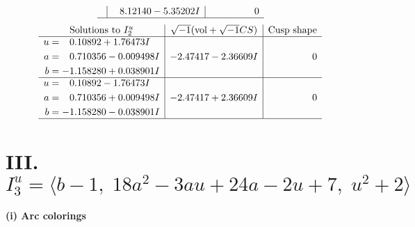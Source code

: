 \documentclass[1p]{elsarticle_modified}
\theoremstyle{definition}
\newcommand{\I}{\sqrt{-1}}
\begin{document}
$$\begin{array}{c|c|c}
 & \phantom{-}8.12140 - 5.35202 I & \phantom{-0.000000 } 0\\
 \hline 
 \end{array}$$\newpage$$\begin{array}{c|c|c}  
\text{Solutions to }I^u_{2}& \I (\text{vol} + \sqrt{-1}CS) & \text{Cusp shape}\\
 \hline 
\begin{aligned}
u &= \phantom{-}0.10892 + 1.76473 I \\
a &= \phantom{-}0.710356 - 0.009498 I \\
b &= -1.158280 + 0.038901 I\end{aligned}
 & -2.47417 - 2.36609 I & \phantom{-0.000000 } 0 \\ \hline\begin{aligned}
u &= \phantom{-}0.10892 - 1.76473 I \\
a &= \phantom{-}0.710356 + 0.009498 I \\
b &= -1.158280 - 0.038901 I\end{aligned}
 & -2.47417 + 2.36609 I & \phantom{-0.000000 } 0\\
 \hline 
 \end{array}$$\newpage\newpage\renewcommand{\arraystretch}{1}
\centering \section*{III. $I^u_{3}= \langle b-1,\;18 a^2-3 a u+24 a-2 u+7,\;u^2+2 \rangle$}
\flushleft \textbf{(i) Arc colorings}\\
\end{document}
